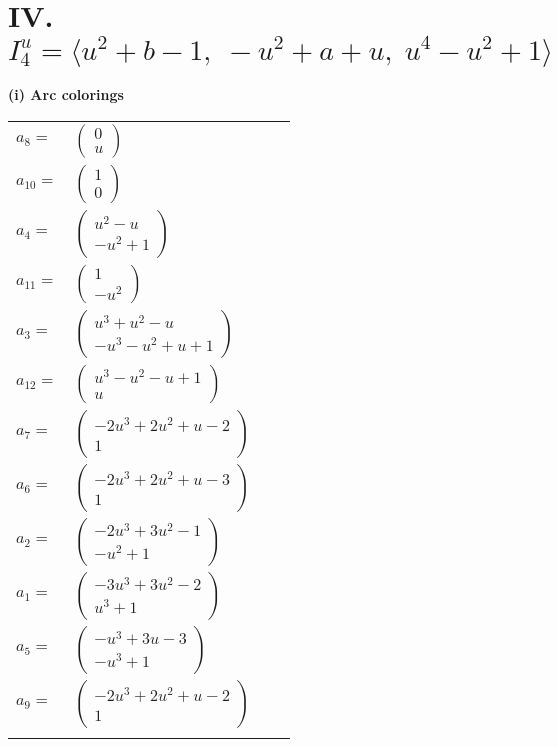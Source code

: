 \documentclass[1p]{elsarticle_modified}
\theoremstyle{definition}
\begin{document}
\centering \section*{IV. $I^u_{4}= \langle u^2+b-1,\;- u^2+a+u,\;u^4- u^2+1 \rangle$}
\flushleft \textbf{(i) Arc colorings}\\
\begin{tabular}{m{7pt} m{180pt} m{7pt} m{180pt} }
\flushright $a_{8}=$&$\begin{pmatrix}0\\u\end{pmatrix}$ \\
\flushright $a_{10}=$&$\begin{pmatrix}1\\0\end{pmatrix}$ \\
\flushright $a_{4}=$&$\begin{pmatrix}u^2- u\\- u^2+1\end{pmatrix}$ \\
\flushright $a_{11}=$&$\begin{pmatrix}1\\- u^2\end{pmatrix}$ \\
\flushright $a_{3}=$&$\begin{pmatrix}u^3+u^2- u\\- u^3- u^2+u+1\end{pmatrix}$ \\
\flushright $a_{12}=$&$\begin{pmatrix}u^3- u^2- u+1\\u\end{pmatrix}$ \\
\flushright $a_{7}=$&$\begin{pmatrix}-2 u^3+2 u^2+u-2\\1\end{pmatrix}$ \\
\flushright $a_{6}=$&$\begin{pmatrix}-2 u^3+2 u^2+u-3\\1\end{pmatrix}$ \\
\flushright $a_{2}=$&$\begin{pmatrix}-2 u^3+3 u^2-1\\- u^2+1\end{pmatrix}$ \\
\flushright $a_{1}=$&$\begin{pmatrix}-3 u^3+3 u^2-2\\u^3+1\end{pmatrix}$ \\
\flushright $a_{5}=$&$\begin{pmatrix}- u^3+3 u-3\\- u^3+1\end{pmatrix}$ \\
\flushright $a_{9}=$&$\begin{pmatrix}-2 u^3+2 u^2+u-2\\1\end{pmatrix}$\\&\end{tabular}
\end{document}

